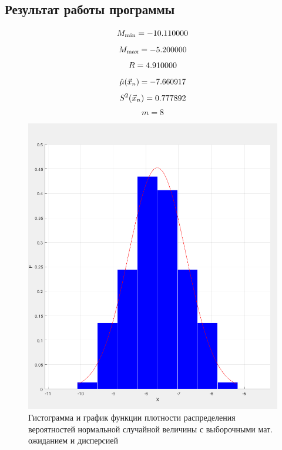 \documentclass[12pt]{report}
\begin{document}
\subsection*{Результат работы программы}
\begin{equation*}
	M_{\min} = -10.110000 \\
\end{equation*}
\begin{equation*}
	M_{\max} = -5.200000 \\
\end{equation*}
\begin{equation*}
	R = 4.910000 \\
\end{equation*}
\begin{equation*}
	\hat\mu(\vec x_n) = -7.660917 \\
\end{equation*}
\begin{equation*}
	S^2(\vec x_n) = 0.777892 \\
\end{equation*}
\begin{equation*}
	m = 8
\end{equation*}

\newpage

\captionsetup{justification=centering}

\begin{figure}[h!]
	\centering
	\includegraphics[width=\textwidth]{img/hist}
	\caption{Гистограмма и график функции плотности распределения вероятностей нормальной случайной величины с выборочными мат. ожиданием и дисперсией}
\end{figure}
\end{document}
